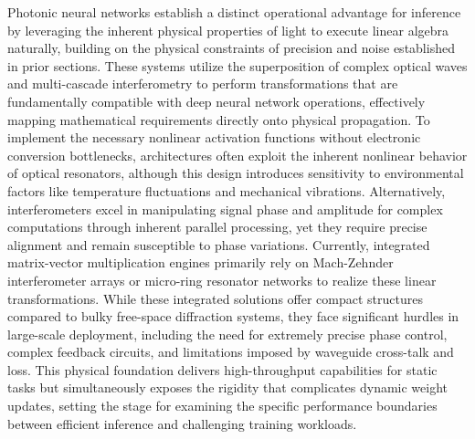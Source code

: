 Photonic neural networks establish a distinct operational advantage for inference by leveraging the inherent physical properties of light to execute linear algebra naturally, building on the physical constraints of precision and noise established in prior sections. These systems utilize the superposition of complex optical waves and multi-cascade interferometry to perform transformations that are fundamentally compatible with deep neural network operations, effectively mapping mathematical requirements directly onto physical propagation. \citep{doi_10_1007_s11075_025_02218_2_e396aae0} \citep{doi_10_48550_arxiv_2510_03186_c4d4955e} To implement the necessary nonlinear activation functions without electronic conversion bottlenecks, architectures often exploit the inherent nonlinear behavior of optical resonators, although this design introduces sensitivity to environmental factors like temperature fluctuations and mechanical vibrations. Alternatively, interferometers excel in manipulating signal phase and amplitude for complex computations through inherent parallel processing, yet they require precise alignment and remain susceptible to phase variations. Currently, integrated matrix-vector multiplication engines primarily rely on Mach-Zehnder interferometer arrays or micro-ring resonator networks to realize these linear transformations. \citep{doi_10_1117_12_2690776_82e594d2} \citep{doi_10_54254_2753_8818_2026_33628_f99a21e9} While these integrated solutions offer compact structures compared to bulky free-space diffraction systems, they face significant hurdles in large-scale deployment, including the need for extremely precise phase control, complex feedback circuits, and limitations imposed by waveguide cross-talk and loss. This physical foundation delivers high-throughput capabilities for static tasks but simultaneously exposes the rigidity that complicates dynamic weight updates, setting the stage for examining the specific performance boundaries between efficient inference and challenging training workloads. \citep{doi_10_3390_nano14080697_c372a140} \citep{s2_b765388f3cc18d6e5a0507522822def0e3503ec6_fa09b483} \citep{doi_10_1088_1402_4896_ae8345_3b948559}

